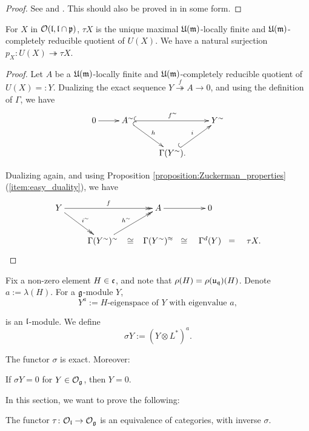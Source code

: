 \documentclass[a4paper,10pt]{article}
\begin{document}
\begin{proof}
See \cite[\S5.]{es} and \cite{ew}. This should also be proved in \cite{kv} in some form.
\end{proof}

\begin{lemma}
\label{lemma:max_quotient}
For $X$ in $\mathcal{O}(\mathfrak{l,l\cap p})$, $\tau X$ is the unique maximal $\mathfrak{U(m)}$-locally finite and $\mathfrak{U(m)}$-completely reducible quotient of $U(X)$. We have a natural surjection $p_X \colon U(X) \twoheadrightarrow \tau X$.
\end{lemma}

\begin{proof}
Let $A$ be a $\mathfrak{U(m)}$-locally finite and $\mathfrak{U(m)}$-completely reducible quotient of $U(X)=:Y$. Dualizing the exact sequence $Y \stackrel{f}{\twoheadrightarrow} A \to 0$, and using the definition of $\Gamma$, we have
%
\[ \xymatrix{
0 \ar[r] & A^\sim \ar@{^{(}->}[rr]^{f^\sim} \ar@{^{(}->}[rd]^{h} & & Y^\sim \\
  &  & \Gamma(Y^\sim) \ar@{^{(}->}[ru]^{i} .}
\]

Dualizing again, and using Proposition \ref{proposition:Zuckerman_properties}(\ref{item:easy_duality}), we have
%
\[ \xymatrix{
Y \ar@{->>}[rr]^{f} \ar@{->>}[rd]^{i^\sim} & & A \ar[r] & 0\\
& \Gamma(Y^\sim)^\sim \ar@{->>}[ru]^{h^\sim} \ar@{}[r]|*=0[@]{\cong} & \Gamma(Y^\sim)^\approx \ar@{}[r]|*=0[@]{\cong} & \Gamma^d(Y) \ar@{}[r]|*=0[@]{=} & \tau X . }
\]

\end{proof}


Fix a non-zero element $H \in \mathfrak{c}$, and note that $\rho(H)=\rho(\mathfrak{u_q})(H)$. Denote $a := \lambda(H)$. For a $\mathfrak{g}$-module $Y$,
%
\[ Y^a := \text{$H$-eigenspace of $Y$ with eigenvalue $a$}, \]

is an $\mathfrak{l}$-module. We define
%
\[ \sigma Y := (Y \otimes L^\ast)^a. \]

The functor $\sigma$ is exact. Moreover:
%
\begin{lemma}
\label{lemma:sigmaX=0}
If $\sigma Y =0$ for $Y \in \mathcal{O}_{\mathfrak{g}}$,  then $Y=0$. 
\end{lemma}

In this section, we want to prove the following:

\begin{theorem}[ES1]
\label{theorem:es1}
The functor $\tau \colon \mathcal{O}_{\mathfrak{l}} \to \mathcal{O}_{\mathfrak{g}}$ is an equivalence of categories, with inverse $\sigma$.
\end{theorem}
\end{document}
